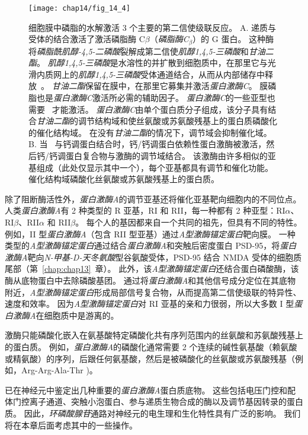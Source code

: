 \begin{figure}[htbp]
	\centering
	\texttt{[image: chap14/fig\_14\_4]}
	\caption{细胞膜中磷脂的水解激活 3 个主要的第二信使级联反应。
		A. 递质与受体的结合激活了激活磷脂酶 C$\beta$（\textit{磷脂酶C}$_\beta$）的 G 蛋白。
		这种酶将\textit{磷脂酰肌醇-4,5-二磷酸}裂解成第二信使\textit{肌醇1,4,5-三磷酸}和\textit{甘油二酯}。
		\textit{肌醇1,4,5-三磷酸}是水溶性的并扩散到细胞质中，在那里它与光滑内质网上的\textit{肌醇1,4,5-三磷酸}受体通道结合，从而从内部储存中释放~。
		\textit{甘油二酯}保留在膜中，在那里它募集并激活\textit{蛋白激酶C}。
		膜磷脂也是\textit{蛋白激酶C}激活所必需的辅助因子。
		\textit{蛋白激酶C}的一些亚型也需要~ 才能激活。
		\textit{蛋白激酶C}由单个蛋白质分子组成，该分子具有结合\textit{甘油二酯}的调节结构域和使丝氨酸或苏氨酸残基上的蛋白质磷酸化的催化结构域。
		在没有\textit{甘油二酯}的情况下，调节域会抑制催化域。
		B. 当~ 与钙调蛋白结合时，钙/钙调蛋白依赖性蛋白激酶被激活，然后钙/钙调蛋白复合物与激酶的调节域结合。
		该激酶由许多相似的亚基组成（此处仅显示其中一个），每个亚基都具有调节和催化功能。
		催化结构域磷酸化丝氨酸或苏氨酸残基上的蛋白质。}
	\label{fig:14_4}
\end{figure}


除了阻断酶活性外，\textit{蛋白激酶A}的调节亚基还将催化亚基靶向细胞内的不同位点。
人类\textit{蛋白激酶A}有 2 种类型的 R 亚基，RI 和 RII，每一种都有 2 种亚型：RI$\alpha$、RI$\beta$、RII$\alpha$ 和 RII$\beta$。
每个人的基因都来自一个共同的祖先，但具有不同的特性。
例如，II 型\textit{蛋白激酶A}（包含 RII 型亚基）通过\textit{A型激酶锚定蛋白}靶向膜。
一种类型的\textit{A型激酶锚定蛋白}通过结合\textit{蛋白激酶A}和突触后密度蛋白 PSD-95，将\textit{蛋白激酶A}靶向\textit{N-甲基-D-天冬氨酸}型谷氨酸受体，PSD-95 结合 NMDA 受体的细胞质尾部（第~\ref{chap:chap13}~章）。
此外，该\textit{A型激酶锚定蛋白}还结合蛋白磷酸酶，该酶从底物蛋白中去除磷酸基团。
通过将\textit{蛋白激酶A}和其他信号成分定位在其底物附近，\textit{A型激酶锚定蛋白}形成局部信号复合物，从而提高第二信使级联的特异性、速度和效率。
因为\textit{A型激酶锚定蛋白}对 RI 亚基的亲和力很弱，所以大多数 I 型\textit{蛋白激酶A}在细胞质中是游离的。


激酶只能磷酸化嵌入在氨基酸特定磷酸化共有序列范围内的丝氨酸和苏氨酸残基上的蛋白质。
例如，\textit{蛋白激酶A}的磷酸化通常需要 2 个连续的碱性氨基酸（赖氨酸或精氨酸）的序列，后跟任何氨基酸，然后是被磷酸化的丝氨酸或苏氨酸残基（例如，Arg-Arg-Ala-Thr )。


已在神经元中鉴定出几种重要的\textit{蛋白激酶A}蛋白质底物。
这些包括电压门控和配体门控离子通道、突触小泡蛋白、参与递质生物合成的酶以及调节基因转录的蛋白质。
因此，\textit{环磷酸腺苷}通路对神经元的电生理和生化特性具有广泛的影响。
我们将在本章后面考虑其中的一些操作。



